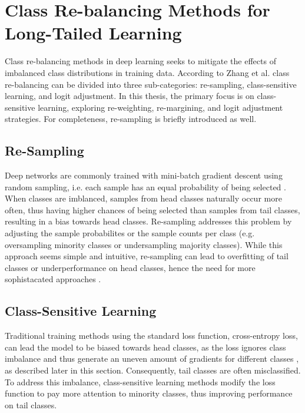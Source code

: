 
\section{Class Re-balancing Methods for Long-Tailed Learning}
\label{sec:lt_methods}

Class re-balancing methods in deep learning seeks to mitigate the effects of imbalanced class distributions in training data. According to Zhang et al. \cite{zhang2023deep} class re-balancing can be divided into three sub-categories: re-sampling, class-sensitive learning, and logit adjustment. In this thesis, the primary focus is on class-sensitive learning, exploring re-weighting, re-margining, and logit adjustment strategies. For completeness, re-sampling is briefly introduced as well.


\subsection{Re-Sampling}
\label{sec:re-sampling}
Deep networks are commonly trained with mini-batch gradient descent using random sampling, i.e. each sample has an equal probability of being selected \cite{zhang2023deep}. When classes are imblanced, samples from head classes naturally occur more often, thus having higher chances of being selected than samples from tail classes, resulting in a bias towards head classes. Re-sampling addresses this problem by adjusting the sample probabilites or the sample counts per class (e.g. oversampling minority classes or undersampling majority classes). While this approach seems simple and intuitive, re-sampling can lead to overfitting of tail classes or underperformance on head classes, hence the need for more sophistacated approaches \cite{zhang2023deep}.

\subsection{Class-Sensitive Learning}
\label{sec:class-sensitive-learning}

Traditional training methods using the standard loss function, cross-entropy loss, can lead the model to be biased towards head classes, as the loss ignores class imbalance and thus generate an uneven amount of gradients for different classes \cite{zhang2023deep}, as described later in this section. Consequently, tail classes are often misclassified. To address this imbalance, class-sensitive learning methods modify the loss function to pay more attention to minority classes, thus improving performance on tail classes.

